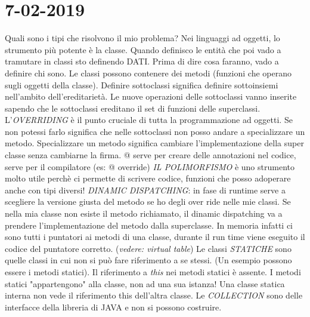 

\newpage
\section{7-02-2019}
\par
Quali sono i tipi che risolvono il mio problema? \newline
Nei linguaggi ad oggetti, lo strumento più potente è la classe. Quando definisco le entità
che poi vado a tramutare in classi sto definendo DATI. \newline
Prima di dire cosa faranno, vado a definire chi sono. \newline
Le classi possono contenere dei metodi (funzioni che operano sugli oggetti della classe). \newline
Definire sottoclassi significa definire sottoinsiemi nell'ambito dell'ereditarietà. Le nuove operazioni delle sottoclassi vanno inserite sapendo che le sottoclassi ereditano il set di funzioni delle superclassi. \newline
L'\textit{OVERRIDING} è il punto cruciale di tutta la programmazione ad oggetti. Se non potessi farlo significa che nelle sottoclassi non posso andare a specializzare un metodo. Specializzare un metodo significa cambiare l'implementazione della super classe senza cambiarne la firma. \newline
@ serve per creare delle annotazioni nel codice, serve per il compilatore (es: @ override)
\newline
\textit{IL POLIMORFISMO} è uno strumento molto utile perchè ci permette di scrivere codice, funzioni che posso adoperare anche con tipi diversi!
\newline
\textit{DINAMIC DISPATCHING}: in fase di runtime serve a scegliere la versione giusta 
del metodo se ho degli over ride nelle mie classi. Se nella mia classe non esiste il metodo richiamato, il dinamic dispatching va a prendere l'implementazione del metodo dalla superclasse. In memoria infatti ci sono tutti i puntatori ai metodi di una classe, durante il run time viene eseguito il codice del puntatore corretto. (\textit{vedere: virtual table})
\newline
Le classi \textit{STATICHE} sono quelle classi in cui non si può fare riferimento a se stessi. (Un esempio possono essere i metodi statici). Il riferimento a \textit{this} nei metodi statici è assente. I metodi statici "appartengono" alla classe, non ad una sua istanza! Una classe statica interna non vede il riferimento this dell'altra classe. \newline
Le \textit{COLLECTION} sono delle interfacce della libreria di JAVA e non si possono costruire.
\newline

